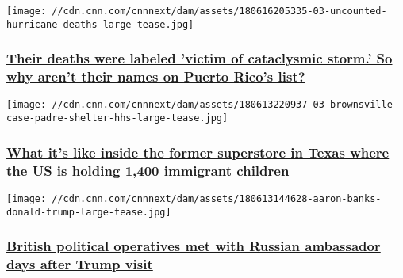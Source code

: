 \href{/2018/06/16/health/cataclysmic-storm-deaths-puerto-rico-maria-invs/index.html}{}

\texttt{[image: //cdn.cnn.com/cnnnext/dam/assets/180616205335-03-uncounted-hurricane-deaths-large-tease.jpg]}

\hypertarget{their-deaths-were-labeled-victim-of-cataclysmic-storm-so-why-arent-their-names-on-puerto-ricos-list}{%
\subsubsection{\texorpdfstring{\href{/2018/06/16/health/cataclysmic-storm-deaths-puerto-rico-maria-invs/index.html}{Their
deaths were labeled 'victim of cataclysmic storm.' So why aren't their
names on Puerto Rico's
list?}}{Their deaths were labeled 'victim of cataclysmic storm.' So why aren't their names on Puerto Rico's list?}}\label{their-deaths-were-labeled-victim-of-cataclysmic-storm-so-why-arent-their-names-on-puerto-ricos-list}}

\href{/2018/06/14/us/inside-immigrant-children-shelter-brownsville-texas-invs/index.html}{}

\texttt{[image: //cdn.cnn.com/cnnnext/dam/assets/180613220937-03-brownsville-case-padre-shelter-hhs-large-tease.jpg]}

\hypertarget{what-its-like-inside-the-former-superstore-in-texas-where-the-us-is-holding-1400-immigrant-children}{%
\subsubsection{\texorpdfstring{\href{/2018/06/14/us/inside-immigrant-children-shelter-brownsville-texas-invs/index.html}{What
it's like inside the former superstore in Texas where the US is holding
1,400 immigrant
children}}{What it's like inside the former superstore in Texas where the US is holding 1,400 immigrant children}}\label{what-its-like-inside-the-former-superstore-in-texas-where-the-us-is-holding-1400-immigrant-children}}

\href{/2018/06/13/politics/banks-wigmore-russian-ambassador-meetings/index.html}{}

\texttt{[image: //cdn.cnn.com/cnnnext/dam/assets/180613144628-aaron-banks-donald-trump-large-tease.jpg]}

\hypertarget{british-political-operatives-met-with-russian-ambassador-days-after-trump-visit}{%
\subsubsection{\texorpdfstring{\href{/2018/06/13/politics/banks-wigmore-russian-ambassador-meetings/index.html}{British
political operatives met with Russian ambassador days after Trump
visit}}{British political operatives met with Russian ambassador days after Trump visit}}\label{british-political-operatives-met-with-russian-ambassador-days-after-trump-visit}}

